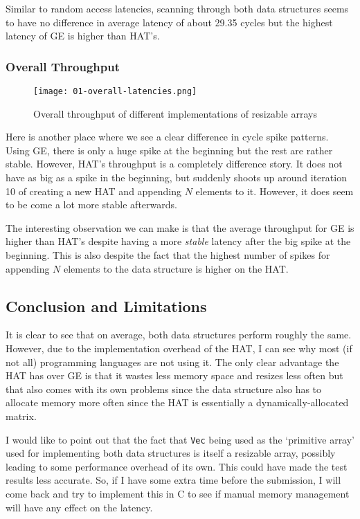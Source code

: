 Similar to random access latencies, scanning through both data structures seems to have no difference in average latency of about 29.35 cycles but the highest latency of GE is higher than HAT's.

\endgroup

\begingroup

\subsubsection{Overall Throughput}

\begin{figure}[H]
	\begin{center}
		\texttt{[image: 01-overall-latencies.png]}
		\caption{Overall throughput of different implementations of resizable arrays}
		\label{fig:overall-throughput}
	\end{center}
\end{figure}

Here is another place where we see a clear difference in cycle spike patterns. Using GE, there is only a huge spike at the beginning but the rest are rather stable. However, HAT's throughput is a completely difference story. It does not have as big as a spike in the beginning, but suddenly shoots up around iteration 10 of creating a new HAT and appending $N$ elements to it. However, it does seem to be come a lot more stable afterwards.

The interesting observation we can make is that the average throughput for GE is higher than HAT's despite having a more \textit{stable} latency after the big spike at the beginning. This is also despite the fact that the highest number of spikes for appending $N$ elements to the data structure is higher on the HAT.

\endgroup

\begingroup

\subsection{Conclusion and Limitations}

It is clear to see that on average, both data structures perform roughly the same. However, due to the implementation overhead of the HAT, I can see why most (if not all) programming languages are not using it. The only clear advantage the HAT has over GE is that it wastes less memory space and resizes less often but that also comes with its own problems since the data structure also has to allocate memory more often since the HAT is essentially a dynamically-allocated matrix.

I would like to point out that the fact that \texttt{Vec} being used as the `primitive array' used for implementing both data structures is itself a resizable array, possibly leading to some performance overhead of its own. This could have made the test results less accurate. So, if I have some extra time before the submission, I will come back and try to implement this in C to see if manual memory management will have any effect on the latency.

\endgroup
